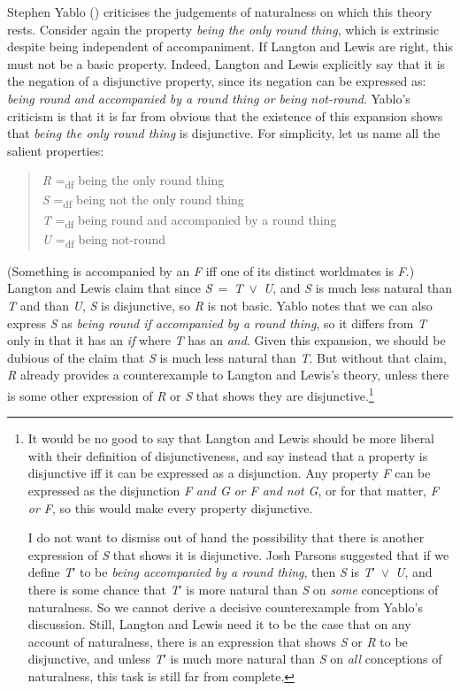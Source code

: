 \documentclass[
  11pt,
  letterpaper,
  DIV=11,
  numbers=noendperiod,
  twoside]{scrartcl}
\begin{document}
Stephen Yablo () criticises the
judgements of naturalness on which this theory rests. Consider again the
property \emph{being the only round thing}, which is extrinsic despite
being independent of accompaniment. If Langton and Lewis are right, this
must not be a basic property. Indeed, Langton and Lewis explicitly say
that it is the negation of a disjunctive property, since its negation
can be expressed as: \emph{being round and accompanied by a round thing
or being not-round}. Yablo's criticism is that it is far from obvious
that the existence of this expansion shows that \emph{being the only
round thing} is disjunctive. For simplicity, let us name all the salient
properties:

\begin{quote}
\emph{R} =\textsubscript{df} being the only round thing\\
\emph{S} =\textsubscript{df} being not the only round thing\\
\emph{T} =\textsubscript{df} being round and accompanied by a round
thing\\
\emph{U} =\textsubscript{df} being not-round
\end{quote}

(Something is accompanied by an \emph{F} iff one of its distinct
worldmates is \emph{F}.) Langton and Lewis claim that since
\emph{S}~=~\emph{T}~\({\vee}\)~\emph{U}, and \emph{S} is much less
natural than \emph{T} and than \emph{U}, \emph{S} is disjunctive, so
\emph{R} is not basic. Yablo notes that we can also express \emph{S} as
\emph{being round if accompanied by a round thing}, so it differs from
\emph{T} only in that it has an \emph{if} where \emph{T} has an
\emph{and}. Given this expansion, we should be dubious of the claim that
\emph{S} is much less natural than \emph{T}. But without that claim,
\emph{R} already provides a counterexample to Langton and Lewis's
theory, unless there is some other expression of \emph{R} or \emph{S}
that shows they are disjunctive.\footnote{It would be no good to say
  that Langton and Lewis should be more liberal with their definition of
  disjunctiveness, and say instead that a property is disjunctive iff it
  can be expressed as a disjunction. Any property \emph{F} can be
  expressed as the disjunction \emph{F} \emph{and G} \emph{or F and not
  G}, or for that matter, \emph{F or F}, so this would make every
  property disjunctive.

  I do not want to dismiss out of hand the possibility that there is
  another expression of \emph{S} that shows it is disjunctive. Josh
  Parsons suggested that if we define \emph{T}′ to be \emph{being
  accompanied by a round thing}, then \emph{S} is
  \emph{T}′~\({\vee}\)~\emph{U}, and there is some chance that \emph{T}′
  is more natural than \emph{S} on \emph{some} conceptions of
  naturalness. So we cannot derive a decisive counterexample from
  Yablo's discussion. Still, Langton and Lewis need it to be the case
  that on any account of naturalness, there is an expression that shows
  \emph{S} or \emph{R} to be disjunctive, and unless \emph{T}′ is much
  more natural than \emph{S} on \emph{all} conceptions of naturalness,
  this task is still far from complete.}
\end{document}
